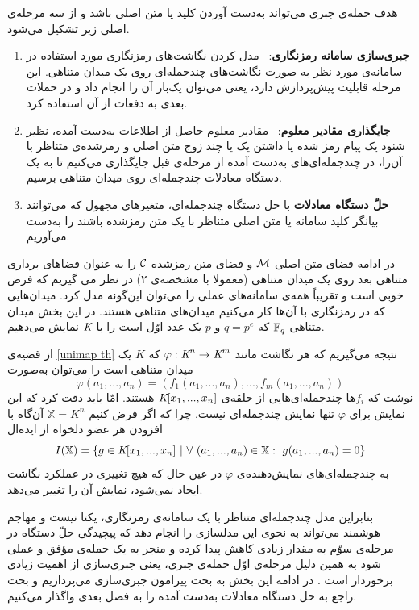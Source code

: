 هدف حمله‌ی جبری می‌تواند به‌دست آوردن کلید یا متن اصلی باشد و از سه مرحله‌ی اصلی زیر تشکیل می‌شود.
\begin{enumerate}
\item
\textbf{جبری‌سازی سامانه رمزنگاری}: \ 
مدل کردن نگاشت‌های رمزنگاری مورد استفاده در سامانه‌ی مورد نظر به صورت نگاشت‌های چندجمله‌ای روی یک میدان متناهی. این مرحله قابلیت پیش‌پردازش دارد، یعنی می‌توان یک‌بار آن را انجام داد و در حملات بعدی به دفعات از آن استفاده کرد. 
\item
\textbf{جایگذاری مقادیر معلوم}: \ 
مقادیر معلوم حاصل از اطلاعات به‌دست آمده، نظیر شنود یک پیام رمز شده یا داشتن یک یا چند زوج متن اصلی و رمزشده‌ی متناظر با آن‌را، در چندجمله‌ای‌های به‌دست آمده از مرحله‌ی قبل جایگذاری می‌کنیم تا به یک دستگاه معادلات چندجمله‌ای روی میدان متناهی برسیم.
\item
\textbf{حلّ دستگاه معادلات}
با حل دستگاه چندجمله‌ای، متغیرهای مجهول که می‌توانند بیانگر کلید سامانه یا متن اصلی متناظر با یک متن رمز‌شده باشند را به‌دست می‌آوریم.
\end{enumerate}

در ادامه فضای متن اصلی 
${\mathcal M}$
و فضای متن رمزشده 
${\mathcal C}$
را به عنوان فضاهای برداری متناهی بعد روی یک میدان متناهی (معمولا با مشخصه‌ی ۲) در نظر می گیریم که فرض خوبی است و تقریباً همه‌ی سامانه‌های عملی را می‌توان این‌گونه مدل کرد. میدان‌هایی که در رمزنگاری با آن‌ها کار می‌کنیم میدان‌های متناهی هستند. در این بخش میدان متناهی 
$\mathbb{F}_{q}$
که 
$q = p^{e}$
و 
$p$
یک عدد اوّل است را با 
$\textit{K}$
نمایش می‌دهیم. 
\begin{remark}
از قضیه‌ی 
\ref{unimap th}
نتیجه می‌گیریم که هر نگاشت مانند 
$\varphi:\textit{K}^{n}\rightarrow\textit{K}^{m}$
که 
$K$
یک میدان متناهی است را می‌توان به‌صورت 
$$\varphi(a_{1},...,a_{n}) = (f_{1}(a_{1},...,a_{n}),...,f_{m}(a_{1},...,a_{n}))$$
نوشت که 
$f_{i}$ها
 چندجمله‌ای‌هایی از حلقه‌ی 
$\textit{K}[x_{1},...,x_{n}]$
هستند. امّا باید دقت کرد که این نمایش برای 
$\varphi$
تنها نمایش چندجمله‌ای نیست. چرا که اگر فرض کنیم 
$\mathbb{X} = K^{n}$
آن‌گاه با افزودن هر عضو دلخواه از ایده‌ال 
$$I(\mathbb{X}) = \{g\in\polyring \ | \ \fa \ (a_{1},...,a_{n})\in\mathbb{X}: \ g(a_{1},...,a_{n}) = 0 \}$$
به چندجمله‌ای‌های نمایش‌دهنده‌ی 
$\varphi$
در عین حال که هیچ تغییری در عملکرد نگاشت ایجاد نمی‌شود، نمایش آن را تغییر می‌دهد.
\end{remark}
بنابراین مدل چندجمله‌ای متناظر با یک سامانه‌ی رمزنگاری، یکتا نیست و مهاجم هوشمند می‌تواند به نحوی این مدلسازی را انجام دهد که پیچیدگی حلّ دستگاه در مرحله‌ی سوّم به مقدار زیادی کاهش پیدا کرده و منجر به یک حمله‌ی مؤفق و عملی شود به همین دلیل مرحله‌ی اوّل حمله‌ی جبری، یعنی جبری‌سازی از اهمیت زیادی برخوردار است . در ادامه این بخش به بحث پیرامون جبری‌سازی می‌پردازیم و بحث راجع به حل دستگاه معادلات به‌دست آمده را به فصل‌ بعدی واگذار می‌کنیم.



